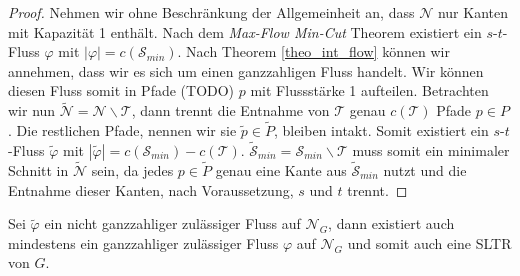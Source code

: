 \begin{proof}
Nehmen wir ohne Beschränkung der Allgemeinheit an, dass $\mathcal{N}$ nur Kanten mit Kapazität 1 enthält. Nach dem \textit{Max-Flow Min-Cut} Theorem existiert ein $s$-$t$-Fluss $\varphi$ mit $|\varphi| = c(\mathcal{S}_{min})$. Nach Theorem \ref{theo_int_flow} können wir annehmen, dass wir es sich um einen ganzzahligen Fluss handelt. Wir können diesen Fluss somit in Pfade (TODO) $p$ mit Flussstärke 1 aufteilen. Betrachten wir nun $\tilde{\mathcal{N}} = \mathcal{N} \backslash \mathcal{T}$, dann trennt die Entnahme von $\mathcal{T}$ genau $c(\mathcal{T})$ Pfade $p \in P$. Die restlichen Pfade, nennen wir sie $\tilde{p} \in \tilde{P}$, bleiben intakt. Somit existiert ein $s$-$t$-Fluss $\tilde{\varphi}$ mit $|\tilde{\varphi}| = c(\mathcal{S}_{min}) - c(\mathcal{T})$. $\tilde{\mathcal{S}}_{min} = \mathcal{S}_{min} \backslash \mathcal{T}$ muss somit ein minimaler Schnitt in $\tilde{\mathcal{N}}$ sein, da jedes $p \in \tilde{P}$ genau eine Kante aus $\tilde{\mathcal{S}}_{min}$ nutzt und die Entnahme dieser Kanten, nach Voraussetzung, $s$ und $t$ trennt.
\end{proof}

\begin{lemma}
Sei $\tilde{\varphi}$ ein nicht ganzzahliger zulässiger Fluss auf $\mathcal{N}_G$, dann existiert auch mindestens ein ganzzahliger zulässiger Fluss $\varphi$ auf $\mathcal{N}_G$ und somit auch eine SLTR von $G$.
\end{lemma}

